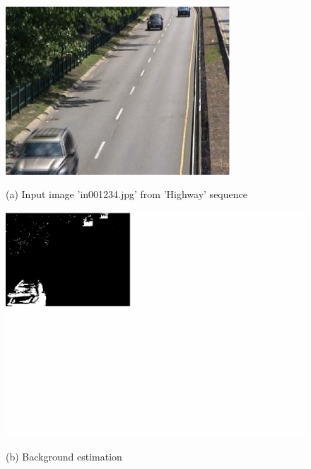 \documentclass{article}
\begin{document}
\begin{figure}[htb]

\begin{minipage}[b]{1.0\linewidth}
  \centering
  \centerline{\includegraphics[width=0.75\textwidth]{fig/in001234}}
  \centerline{(a) Input image 'in001234.jpg' from 'Highway' sequence}\medskip
\end{minipage}
%
\begin{minipage}[b]{.48\linewidth}
  \centering
  \centerline{\includegraphics[width=\textwidth]{fig/block1}}
  \centerline{(b) Background estimation}\medskip

\end{minipage}
\end{figure}
\end{document}

